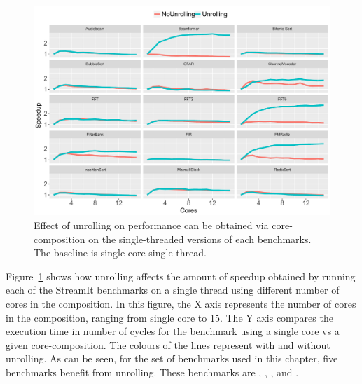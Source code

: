 \begin{figure}[t]
  \includegraphics[width=1\textwidth]{streamit-paper/graphics/unroll_speed_bars2.pdf}
  \caption{Effect of unrolling on performance can be obtained via core-composition on the single-threaded versions of each benchmarks. The baseline is single core single thread.}\label{fig:unroll_summary}
\end{figure}

Figure~\ref{fig:unroll_summary} shows how unrolling affects the amount of speedup obtained by running each of the StreamIt benchmarks on a single thread using different number of cores in the composition.
In this figure, the X axis represents the number of cores in the composition, ranging from single core to 15.
The Y axis compares the execution time in number of cycles for the benchmark using a single core vs a given core-composition.
The colours of the lines represent with and without unrolling.
As can be seen, for the set of benchmarks used in this chapter, five benchmarks benefit from unrolling.
These benchmarks are , , ,  and . 

